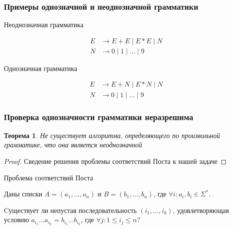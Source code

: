 \documentclass{beamer}
\newtheorem{rutheorem}{Теорема}
\begin{document}
\begin{frame}[fragile]
  \transwipe[direction=90]
  \frametitle{Примеры однозначной и неоднозначной грамматики}

\begin{center}
  Неоднозначная грамматика
\end{center}

\vspace{-0.8cm}

  \begin{align*}
    E &\to E + E \mid E * E \mid N \\
    N &\to 0 \mid 1  \mid \dots \mid 9
  \end{align*}

\vfill

\begin{center}
  Однозначная грамматика
\end{center}

\vspace{-0.8cm}

  \begin{align*}
    E &\to E + N \mid E * N \mid N \\
    N &\to 0 \mid 1  \mid \dots \mid 9
  \end{align*}
\end{frame}

\begin{frame}[fragile]
  \transwipe[direction=90]
  \frametitle{Проверка однозначности грамматики неразрешима}

\begin{rutheorem}
  Не существует алгоритма, определяющего по произвольной грамматике, что она является неоднозначной
\end{rutheorem}

\begin{proof}
  Сведение решения проблемы соответствий Поста к нашей задаче
\end{proof}


\vfill

\begin{center}
  Проблема соответствий Поста
\end{center}

 Даны списки $A = (a_1, \dots, a_n)$ и $B = (b_1 ,\dots ,b_n)$, где $\forall i: a_i, b_i \in \Sigma ^*$.

 Cуществует ли непустая последовательность $(i_1 , \dots, i_k)$, удовлетворяющая условию $a_{i_1} \dots a_{i_k} = b_{i_1} \dots b_{i_k}$, где $\forall j: 1 \leq i_j \leq n$?

\end{frame}
\end{document}
